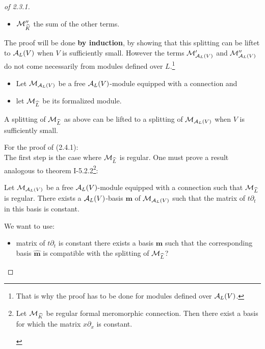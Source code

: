 \begin{proof}[of 2.3.1]
\begin{itemize}
\begin{itemize}
      \end{itemize}
    \item $\mathcal{M}_{\widehat K}''$ the sum of the other terms.
  \end{itemize}
  The proof will be done \textbf{by induction}, by showing that this splitting
  can be liftet to $\mathcal{A}_{L}(V)$ when $V$ is sufficiently small.  However the
  terms $\mathcal{M}_{\mathcal{A}_{L}(V)}'$ and $\mathcal{M}_{\mathcal{A}_{L}(V)}''$ do not come necessarily
  from modules defined over $L$.\footnote{That is why the proof has to be done
  for modules defined over $\mathcal{A}_{L}(V)$.}
  \begin{lem}[2.4.1]
    \begin{itemize}
      \item Let $\mathcal{M}_{\mathcal{A}_L(V)}$ be a free $\mathcal{A}_L(V)$-module equipped with a
        connection and
      \item let $\mathcal{M}_{\widehat L}$ be its formalized module.
    \end{itemize}
    A splitting of $\mathcal{M}_{\widehat L}$ as above can be lifted to a splitting of
    $\mathcal{M}_{\mathcal{A}_L(V)}$ when $V$ is sufficiently small.
  \end{lem}
  For the proof of (2.4.1):
  \\The first step is the case where $\mathcal{M}_{\widehat L}$ is regular. One must prove
  a result analogous to theorem I-5.2.2\footnote{\begin{lem}[I-5.2.2]
      Let $\mathcal{M}_{\widehat K}$ be regular formal meromorphic connection. Then there
      exist a basis for which the matrix $x\partial_x$ is constant.
    \end{lem}}:
  \begin{lem}[2.4.2]
    Let $\mathcal{M}_{\mathcal{A}_L(V)}$ be a free $\mathcal{A}_L(V)$-module equipped with a connection
    such that $\mathcal{M}_{\widehat L}$ is regular.
    There exists a $\mathcal{A}_L(V)$-basis $\textbf{m}$ of $\mathcal{M}_{\mathcal{A}_L(V)}$ such that
    the matrix of $t\partial_t$ in this basis is constant.
  \end{lem}

  We want to use:
  \begin{itemize}
    \item matrix of $t\partial_t$ is constant \Rightarrow{} there exists a
      basis $\textbf{m}$ such that the \textcolor{green!40!black}{corresponding
      basis $\hat{\textbf{m}}$} is compatible with the splitting of
      $\mathcal{M}_{\widehat L}$?
  \end{itemize}
\end{proof}
